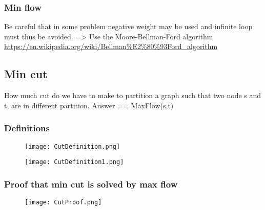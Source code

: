 \subsubsection{Min flow}

\begin{figure}[!ht]
    \centering
\end{figure}

Be careful that in some problem negative weight may be used and infinite loop must thus be avoided. => Use the Moore-Bellman-Ford algorithm \url{https://en.wikipedia.org/wiki/Bellman%E2%80%93Ford_algorithm} 

\subsection{Min cut}

How much cut do we have to make to partition a graph such that two node s and t, are in different partition. Answer == MaxFlow(s,t)

\subsubsection{Definitions}

\begin{figure}[!ht]
    \centering
    \texttt{[image: CutDefinition.png]}
\end{figure}
\FloatBarrier

\begin{figure}[!ht]
    \centering
    \texttt{[image: CutDefinition1.png]}
\end{figure}
\FloatBarrier

\subsubsection{Proof that min cut is solved by max flow}

\begin{figure}[!ht]
    \centering
    \texttt{[image: CutProof.png]}
\end{figure}
\FloatBarrier
